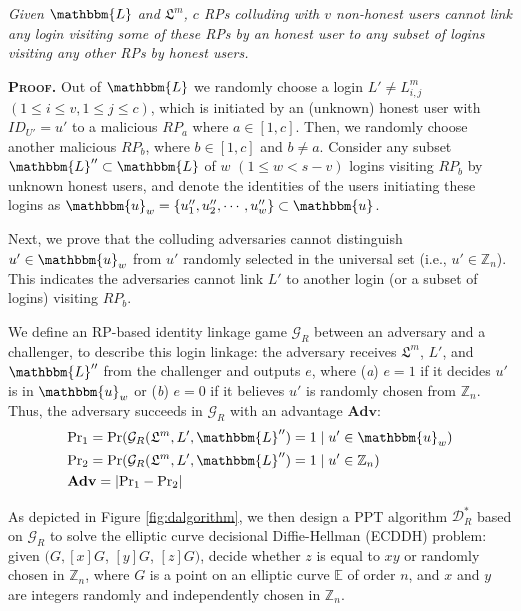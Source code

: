 \begin{thm}[RP Unlinkability]
\emph{Given $\mathbbm{L}$ and $\mathfrak{L}^m$, $c$ RPs colluding with $v$ non-honest users cannot link any login visiting some of these RPs by an honest user to any subset of logins visiting any other RPs by honest users.}
\label{thm-rp-unlinkability}
\end{thm}

\noindent\textbf{\textsc{Proof.}} Out of $\mathbbm{L}$
 we randomly choose a login $L' \neq L^m_{i,j}$ $(1 \le i \le v, 1 \le j \le c)$,
 which is initiated by an (unknown) honest user with $ID_{U'}=u'$ to a malicious $RP_{a}$ where $a \in [1,c]$.
Then, we randomly choose another malicious $RP_{b}$, where $b \in [1,c]$ and $b \neq a$.
Consider any subset $\mathbbm{L}'' \subset \mathbbm{L}$ of $w$ $(1 \leq w < s-v)$ logins visiting $RP_{b}$ by unknown honest users,
 and denote the identities of the users initiating these logins as $\mathbbm{u}_w=\{{u''_1}, {u''_2}, \cdots, {u''_w}\} \subset \mathbbm{u}$.

Next, we prove that the colluding adversaries cannot distinguish $u' \in \mathbbm{u}_w$ from $u'$ randomly selected in the universal set (i.e., $u' \in \mathbb{Z}_n$).
This indicates the adversaries cannot link $L'$ to another login (or a subset of logins) visiting $RP_{b}$.


We define an RP-based identity linkage game $\mathcal{G}_R$ between an adversary and a challenger, to describe this login linkage: the adversary receives $\mathfrak{L}^m$, $L'$, and $\mathbbm{L}''$ from the challenger and outputs $e$, where (\emph{a}) $e = 1$ if it decides $u'$ is in $\mathbbm{u}_w$ %
or (\emph{b}) $e=0$ if it believes $u'$ is randomly chosen from $\mathbb{Z}_n$.
Thus, the adversary succeeds in $\mathcal{G}_R$ with an advantage $\mathbf{Adv}$:
\begin{align*}
&{\rm Pr}_1={\rm Pr}(\mathcal{G}_R(\mathfrak{L}^m, L', \mathbbm{L}'')=1 \;| \; u' \in \mathbbm{u}_w)  \\
&{\rm Pr}_2={\rm Pr}(\mathcal{G}_R(\mathfrak{L}^m, L', \mathbbm{L}'')=1 \; | \; u' \in \mathbb{Z}_n)\\
&{\mathbf{Adv}}=|{\rm Pr}_1-{\rm Pr}_2|
\end{align*}

As depicted in Figure \ref{fig:dalgorithm}, we then design a PPT algorithm $\mathcal{D}^*_R$ based on $\mathcal{G}_R$ to solve the elliptic curve decisional Diffie-Hellman (ECDDH) problem: given $(G, [x]G$, $[y]G$, $[z]G)$, decide whether $z$ is equal to $xy$ or randomly chosen in $\mathbb{Z}_n$, where $G$ is a point on an elliptic curve $\mathbb{E}$ of order $n$, and $x$ and $y$ are integers randomly and independently chosen in $\mathbb{Z}_n$.


